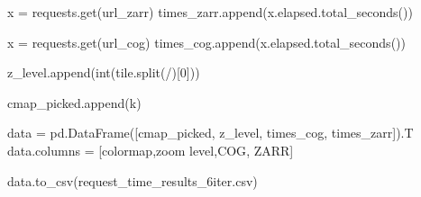 \documentclass[
  oneside,
  open=any]{scrbook}
\newenvironment{Shaded}{\begin{snugshade}}{\end{snugshade}}
\newcommand{\BuiltInTok}[1]{\textcolor[rgb]{0.00,0.23,0.31}{#1}}
\newcommand{\DecValTok}[1]{\textcolor[rgb]{0.68,0.00,0.00}{#1}}
\newcommand{\NormalTok}[1]{\textcolor[rgb]{0.00,0.23,0.31}{#1}}
\newcommand{\OperatorTok}[1]{\textcolor[rgb]{0.37,0.37,0.37}{#1}}
\newcommand{\StringTok}[1]{\textcolor[rgb]{0.13,0.47,0.30}{#1}}
\begin{document}
\begin{Shaded}
\begin{Highlighting}[]
\NormalTok{        x }\OperatorTok{=}\NormalTok{ requests.get(url\_zarr)}
\NormalTok{        times\_zarr.append(x.elapsed.total\_seconds())}

\NormalTok{        x }\OperatorTok{=}\NormalTok{ requests.get(url\_cog)}
\NormalTok{        times\_cog.append(x.elapsed.total\_seconds())}

\NormalTok{        z\_level.append(}\BuiltInTok{int}\NormalTok{(tile.split(}\StringTok{\textquotesingle{}/\textquotesingle{}}\NormalTok{)[}\DecValTok{0}\NormalTok{]))}

\NormalTok{        cmap\_picked.append(k)}

\NormalTok{data }\OperatorTok{=}\NormalTok{ pd.DataFrame([cmap\_picked, z\_level, times\_cog, times\_zarr]).T}
\NormalTok{data.columns }\OperatorTok{=}\NormalTok{ [}\StringTok{\textquotesingle{}colormap\textquotesingle{}}\NormalTok{,}\StringTok{\textquotesingle{}zoom level\textquotesingle{}}\NormalTok{,}\StringTok{\textquotesingle{}COG\textquotesingle{}}\NormalTok{, }\StringTok{\textquotesingle{}ZARR\textquotesingle{}}\NormalTok{]}

\NormalTok{data.to\_csv(}\StringTok{\textquotesingle{}request\_time\_results\_6iter.csv\textquotesingle{}}\NormalTok{)}
\end{Highlighting}
\end{Shaded}



\backmatter
\end{document}
